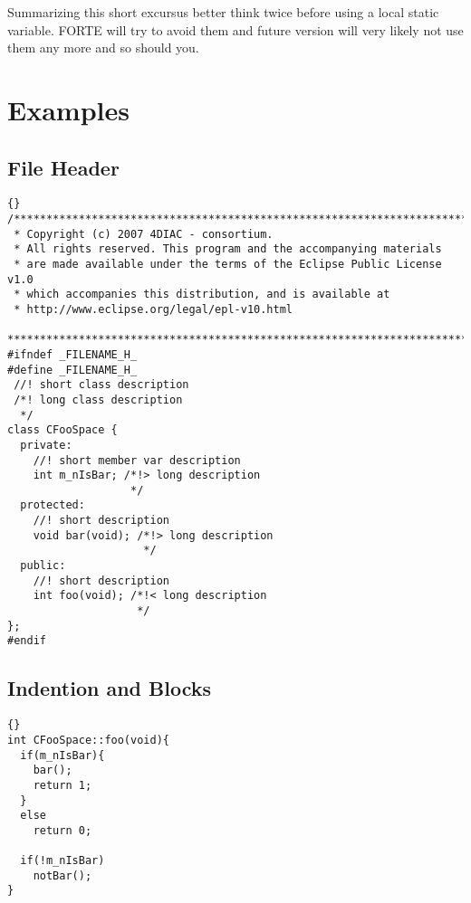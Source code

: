 \documentclass[final,a4paper,10pt, oneside]{article}
\begin{document}
Summarizing this short excursus better think twice before using a local static variable. FORTE will try to avoid them and future version will very likely not use them any more and so should you.


\appendix
\section{Examples}
\subsection{File Header} \label{subsec:FileHeader}

\begin{lstlisting}[frame=trbl]{}
/*******************************************************************************
 * Copyright (c) 2007 4DIAC - consortium.
 * All rights reserved. This program and the accompanying materials
 * are made available under the terms of the Eclipse Public License v1.0
 * which accompanies this distribution, and is available at
 * http://www.eclipse.org/legal/epl-v10.html
 *******************************************************************************
#ifndef _FILENAME_H_  
#define _FILENAME_H_  
 //! short class description
 /*! long class description
  */
class CFooSpace {
  private:
    //! short member var description
    int m_nIsBar; /*!> long description
                   */  
  protected:
    //! short description
    void bar(void); /*!> long description
                     */
  public:
    //! short description
    int foo(void); /*!< long description
                    */   
};
#endif
\end{lstlisting}

\subsection{Indention and Blocks} \label{subsec:IndentionAndBlocks}
\begin{lstlisting}[frame=trbl]{}
int CFooSpace::foo(void){
  if(m_nIsBar){
    bar();
    return 1;
  }
  else
    return 0;
    
  if(!m_nIsBar)
  	notBar();  
}
\end{lstlisting}
\end{document}
